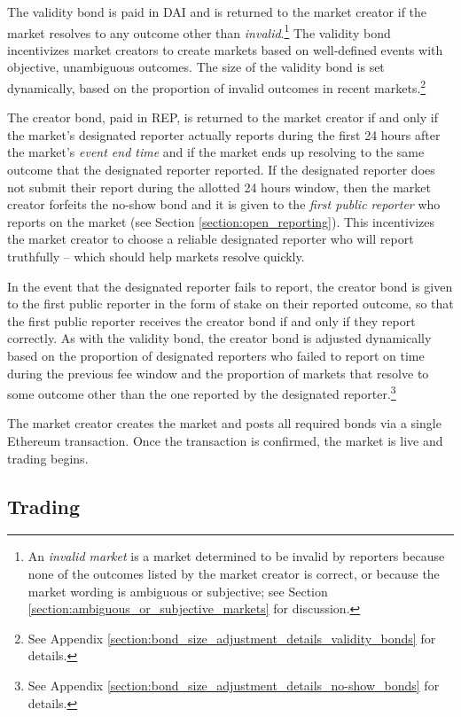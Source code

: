 \documentclass[floatfix,reprint,nofootinbib,amsmath,amssymb,epsfig,pre,floats,letterpaper,groupedaffiliation]{revtex4-1}
\theoremstyle{definition}
\theoremstyle{definition}
\begin{document}
The validity bond is paid in DAI and is returned to the market creator if the market resolves to any outcome other than \textit{invalid}.\footnote{An \textit{invalid market} is a market determined to be invalid by reporters because none of the outcomes listed by the market creator is correct, or because the market wording is ambiguous or subjective; see Section \ref{section:ambiguous_or_subjective_markets} for discussion.}  The validity bond incentivizes market creators to create markets based on well-defined events with objective, unambiguous outcomes.  The size of the validity bond is set dynamically, based on the proportion of invalid outcomes in recent markets.\footnote{See Appendix \ref{section:bond_size_adjustment_details_validity_bonds} for details.}

The creator bond, paid in REP, is returned to the market creator if and only if the market's designated reporter actually reports during the first 24 hours after the market's \textit{event end time} and if the market ends up resolving to the same outcome that the designated reporter reported. If the designated reporter does not submit their report during the allotted 24 hours window, then the market creator forfeits the no-show bond and it is given to the \textit{first public reporter} who reports on the market (see Section \ref{section:open_reporting}).  This incentivizes the market creator to choose a reliable designated reporter who will report truthfully -- which should help markets resolve quickly.

In the event that the designated reporter fails to report, the creator bond is given to the first public reporter in the form of stake on their reported outcome, so that the first public reporter receives the creator bond if and only if they report correctly.  As with the validity bond, the creator bond is adjusted dynamically based on the proportion of designated reporters who failed to report on time during the previous fee window and the proportion of markets that resolve to some outcome other than the one reported by the designated reporter.\footnote{See Appendix \ref{section:bond_size_adjustment_details_no-show_bonds} for details.}

The market creator creates the market and posts all required bonds via a single Ethereum transaction.  Once the transaction is confirmed, the market is live and trading begins.

\subsection{Trading}
\end{document}
